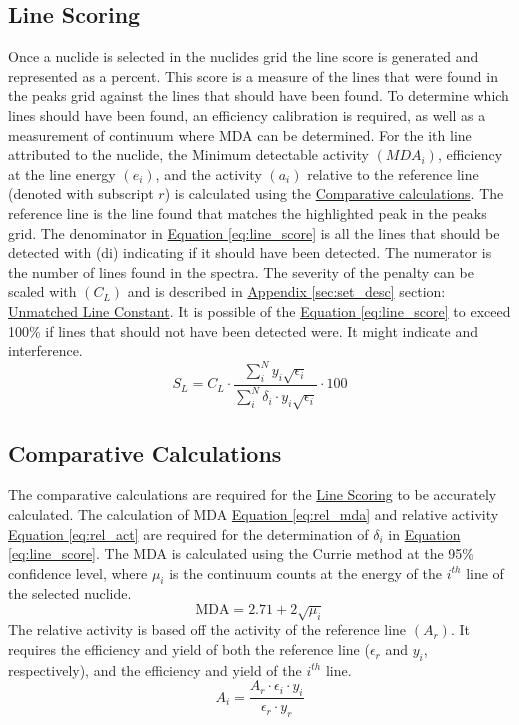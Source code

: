 \documentclass[12pt,report,justified]{SANDreport}
\begin{document}
\subsection{Line Scoring}\label{sec:ln_score}
Once a nuclide is selected in the nuclides grid the line score is generated and represented as a
percent. This score is a measure of the lines that were found in the peaks grid against the lines
that should have been found. To determine which lines should have been found, an efficiency
calibration is required, as well as a measurement of continuum where MDA can be determined.
For the ith line attributed to the nuclide, the Minimum detectable activity \( \left(MDA_i\right) \),
efficiency at
the line energy \(\left(e_i\right)\), and the activity \(\left( a_i\right)\) relative to the reference line (denoted with subscript \(r\)) is
calculated using the \hyperref[sec:comp_calcs]{Comparative calculations}. The reference line is the line found that matches
the highlighted peak in the peaks grid. The denominator in \hyperref[eq:line_score]{Equation \ref{eq:line_score}} is all the lines that should
be detected with (di) indicating if it should have been detected. The numerator is the number of
lines found in the spectra. The severity of the penalty can be scaled with \(\left(C_L\right)\) and is described in
\hyperref[sec:set_desc]{Appendix \ref{sec:set_desc}} section: \hyperref[itm:sm_peak_pen]{Unmatched Line Constant}. It is possible of the \hyperref[eq:line_score]{Equation \ref{eq:line_score}} to exceed 100\% if
lines that should not have been detected were. It might indicate and interference.
\begin{equation}
S_L = C_L \cdot \frac{\sum_i^N y_i \sqrt{\epsilon _i}}{\sum_i^N \delta _i \cdot y_i \sqrt{\epsilon _i}} \cdot 100
\label{eq:line_score}
\end{equation}

\subsection{Comparative Calculations}\label{sec:comp_calcs}
The comparative calculations are required for the \hyperref[sec:ln_score]{Line Scoring} to be accurately calculated. The
calculation of MDA \hyperref[eq:rel_mda]{Equation \ref{eq:rel_mda}} and relative activity \hyperref[eq:rel_act]{Equation \ref{eq:rel_act}} are required for the determination of \(\delta _i\) in \hyperref[eq:line_score]{Equation \ref{eq:line_score}}. The MDA is calculated using the Currie method at the 95\% confidence level, where \(\mu _i\) is the continuum counts at the energy of the \(i^{th}\) line of the selected nuclide.
\begin{equation}
\text{MDA} = 2.71 + 2 \sqrt{\mu _i}
\label{eq:rel_mda}
\end{equation}
The relative activity is based off the activity of the reference line \(\left(A_r\right)\). It requires the efficiency
and yield of both the reference line (\(\epsilon _r \) and  \(y_i\), respectively), and the efficiency and yield of the \(i^{th}\)
line.
\begin{equation}
A_i = \frac{A_r \cdot \epsilon _i \cdot y_i}{\epsilon _r \cdot y_r}
\label{eq:rel_act}
\end{equation}
\end{document}
